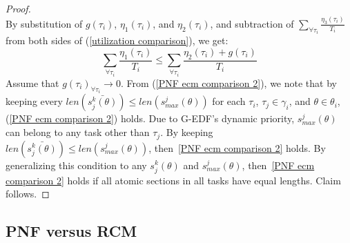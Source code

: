 \documentclass[a4paper,english]{article}
\newtheorem{proof}{Proof}
\begin{document}
\begin{proof}
\begin{equation*}
\end{equation*}
%
By substitution of $g(\tau_{i})$, $\eta_1(\tau_i)$, and $\eta_2(\tau_i)$, and subtraction of $\sum_{\forall \tau_i} \frac{\eta_3(\tau_i)}{T_i}$ from both sides of (\ref{utilization comparison}), we get: 
\begin{equation}
\sum_{\forall \tau_i} \frac{\eta_1(\tau_i)}{T_i} \le \sum_{\forall \tau_i} \frac{\eta_2(\tau_i)+g(\tau_i)}{T_i}
\label{PNF ecm comparison 2}
\end{equation}
Assume that $g(\tau_{i})_{\forall\tau_{i}}\rightarrow0$. From (\ref{PNF ecm comparison 2}), we note that by keeping
every $len(\bar{s_{j}^{k}(\theta)})\le len(s_{max}^{j}(\theta))$
for each $\tau_{i}$, $\tau_{j}\in\gamma_{i}$, and $\theta\in\theta_{i}$,  (\ref{PNF ecm comparison 2}) holds. 
%
Due to G-EDF's dynamic priority, $s_{max}^{j}(\theta)$
can belong to any task other than $\tau_{j}$. By keeping $len(\bar{s_j^k(\theta)})\le len(s_{max}^j(\theta))$, then~\ref{PNF ecm comparison 2} holds. By generalizing this condition to any $s_j^k(\theta)$ and $s_{max}^j(\theta)$, then~\ref{PNF ecm comparison 2} holds if all atomic sections in all tasks have equal lengths. Claim follows.
\end{proof}

\subsection{PNF versus RCM}\label{pnf vs rcm sec}
\end{document}
